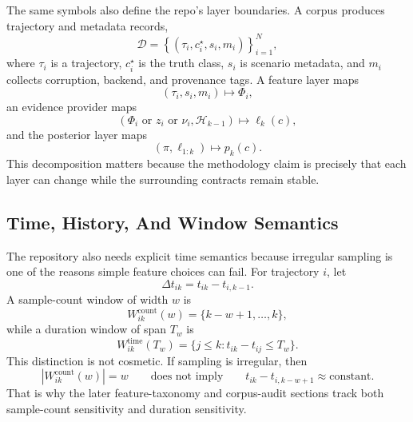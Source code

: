 \documentclass[11pt]{article}
\begin{document}
The same symbols also define the repo's layer boundaries. A corpus produces
trajectory and metadata records,
\begin{equation}
\mathcal{D}
=
\left\{
    (\tau_i, c_i^\star, s_i, m_i)
\right\}_{i=1}^N,
\end{equation}
where \(\tau_i\) is a trajectory, \(c_i^\star\) is the truth class, \(s_i\) is
scenario metadata, and \(m_i\) collects corruption, backend, and provenance
tags. A feature layer maps
\begin{equation}
(\tau_i, s_i, m_i) \mapsto \Phi_i,
\end{equation}
an evidence provider maps
\begin{equation}
(\Phi_i \text{ or } z_i \text{ or } \nu_i, \mathcal{H}_{k-1}) \mapsto \ell_k(c),
\end{equation}
and the posterior layer maps
\begin{equation}
(\pi, \ell_{1:k}) \mapsto p_k(c).
\end{equation}
This decomposition matters because the methodology claim is precisely that each
layer can change while the surrounding contracts remain stable.

\subsection*{Time, History, And Window Semantics}
The repository also needs explicit time semantics because irregular sampling is
one of the reasons simple feature choices can fail. For trajectory \(i\), let
\begin{equation}
\Delta t_{ik} = t_{ik} - t_{i,k-1}.
\end{equation}
A sample-count window of width \(w\) is
\begin{equation}
W^{\mathrm{count}}_{ik}(w) = \{k-w+1,\dots,k\},
\end{equation}
while a duration window of span \(T_w\) is
\begin{equation}
W^{\mathrm{time}}_{ik}(T_w)
=
\{j \le k : t_{ik} - t_{ij} \le T_w\}.
\end{equation}
This distinction is not cosmetic. If sampling is irregular, then
\begin{equation}
|W^{\mathrm{count}}_{ik}(w)| = w
\qquad \text{does not imply} \qquad
t_{ik} - t_{i,k-w+1} \approx \text{constant}.
\end{equation}
That is why the later feature-taxonomy and corpus-audit sections track both
sample-count sensitivity and duration sensitivity.
\end{document}
